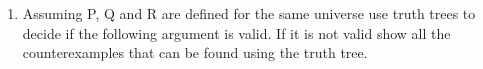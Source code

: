 \documentclass{article}
\def\firstcircle{(90:1.5cm) circle (2cm)}
\def\secondcircle{(210:1.5cm) circle (2cm)}
\def\thirdcircle{(330:1.5cm) circle (2cm)}
\begin{document}
\begin{enumerate}
\begin{center}
    \end{center}

    \item Assuming P, Q and R are defined for the same universe
    use truth trees to decide if the following argument is valid. If it is
    not valid show all the counterexamples that can be found using the truth
    tree.






\end{enumerate}
\end{document}
